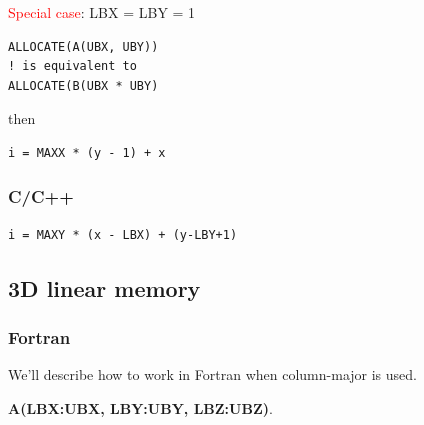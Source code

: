 \textcolor{red}{Special case}: LBX = LBY = 1
\begin{lstlisting}
ALLOCATE(A(UBX, UBY))
! is equivalent to
ALLOCATE(B(UBX * UBY)
\end{lstlisting}
then
\begin{lstlisting}
i = MAXX * (y - 1) + x
\end{lstlisting}



\subsubsection{C/C++}
\label{sec:cc++-1}


\begin{lstlisting}
i = MAXY * (x - LBX) + (y-LBY+1)
\end{lstlisting}


\subsection{3D linear memory}
\label{sec:3d-linear-memory}


\subsubsection{Fortran}
\label{sec:fortran-2}

We'll describe how to work in Fortran when column-major is used.

{\bf A(LBX:UBX, LBY:UBY, LBZ:UBZ)}.  


